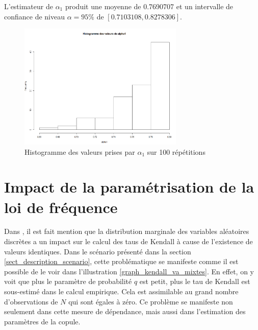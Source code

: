 \documentclass[11pt]{article}
\begin{document}
	L'estimateur de $\alpha_{1}$ produit une moyenne de  0.7690707 et un intervalle de confiance de niveau $\alpha = 95\%$ de $[0.7103108,0.8278306]$.

	\begin{figure}[H]
		\centering
		\includegraphics[height=6cm]{graph/alpha12.png}
		\caption[Paramètre $\alpha_{1}$]{Histogramme des valeurs prises par $\alpha_{1}$ sur 100 répétitions} 
		\label{alpha12}
	\end{figure}


\section{Impact de la paramétrisation de la loi de fréquence}
	
	Dans \cite{nikoloulopoulos2009modeling}, il est fait mention que la distribution marginale des variables aléatoires discrètes a un impact sur le calcul des taus de Kendall à cause de l'existence de valeurs identiques. Dans le scénario présenté dans la section \ref{sect_description_scenario}, cette problématique se manifeste comme il est possible de le voir dans l'illustration \ref{graph_kendall_va_mixtes}. En effet, on y voit que plus le paramètre de probabilité $q$ est petit, plus le tau de Kendall est sous-estimé dans le calcul empirique. Cela est assimilable au grand nombre d'observations de $N$ qui sont égales à zéro. Ce problème se manifeste non seulement dans cette mesure de dépendance, mais aussi dans l'estimation des paramètres de la copule.
	
\end{document}
